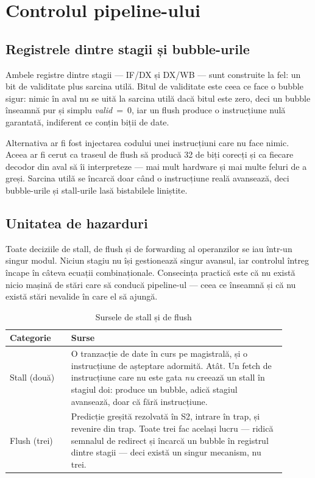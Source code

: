 \documentclass[11pt,openany]{report}
\begin{document}
\section{Controlul pipeline-ului}
\label{sec:pipectl}

\subsection{Registrele dintre stagii și bubble-urile}

Ambele registre dintre stagii --- IF/DX și DX/WB --- sunt construite la fel: un
bit de validitate plus sarcina utilă. Bitul de validitate este ceea ce face o
bubble sigur: nimic în aval nu se uită la sarcina utilă dacă bitul este zero,
deci un bubble înseamnă pur și simplu \emph{valid}~=~0, iar un flush produce o
instrucțiune nulă garantată, indiferent ce conțin biții de date.

Alternativa ar fi fost injectarea codului unei instrucțiuni care nu face nimic.
Aceea ar fi cerut ca traseul de flush să producă 32 de biți corecți și ca
fiecare decodor din aval să îi interpreteze --- mai mult hardware și mai multe
feluri de a greși. Sarcina utilă se încarcă doar când o instrucțiune reală
avansează, deci bubble-urile și stall-urile lasă bistabilele liniștite.

\subsection{Unitatea de hazarduri}

Toate deciziile de stall, de flush și de forwarding al operanzilor se iau
într-un singur modul. Niciun stagiu nu își gestionează singur avansul, iar
controlul întreg încape în câteva ecuații combinaționale. Consecința practică
este că nu există nicio mașină de stări care să conducă pipeline-ul --- ceea ce
înseamnă și că nu există stări nevalide în care el să ajungă.

\begin{table}[H]
\centering
\caption{Sursele de stall și de flush}
\label{tab:hazsurse}
\small
\begin{tabular}{@{}L{0.20\linewidth}L{0.70\linewidth}@{}}
\toprule
\textbf{Categorie} & \textbf{Surse} \\
\midrule
Stall (două) &
  O tranzacție de date în curs pe magistrală, și o instrucțiune de așteptare
  adormită. Atât. Un fetch de instrucțiune care nu este gata \emph{nu}
  creează un stall în stagiul doi: produce un bubble, adică stagiul avansează, doar că fără
  instrucțiune. \\
\addlinespace
Flush (trei) &
  Predicție greșită rezolvată în S2, intrare în trap, și revenire din trap.
  Toate trei fac același lucru --- ridică semnalul de redirect și încarcă
  un bubble în registrul dintre stagii --- deci există un singur mecanism, nu
  trei. \\
\bottomrule
\end{tabular}
\end{table}
\end{document}
